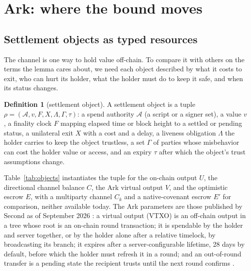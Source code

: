 \documentclass[11pt]{article}
\theoremstyle{plain}
\theoremstyle{definition}
\newtheorem{definition}{Definition}
\theoremstyle{remark}
\newcommand{\auth}{\mathcal{A}}
\begin{document}
\section{Ark: where the bound moves}
\label{sec:ark}

\subsection{Settlement objects as typed resources}

The channel is one way to hold value off-chain. To compare it with others on the terms the lemma cares about, we need each object described by what it costs to exit, who can hurt its holder, what the holder must do to keep it safe, and when its status changes.

\begin{definition}[settlement object]
A settlement object is a tuple $\rho=(\auth,v,F,X,\Lambda,\Gamma,\tau)$: a spend authority $\auth$ (a script or a signer set), a value $v$, a finality clock $F$ mapping elapsed time or block height to a settled or pending status, a unilateral exit $X$ with a cost and a delay, a liveness obligation $\Lambda$ the holder carries to keep the object trustless, a set $\Gamma$ of parties whose misbehavior can cost the holder value or access, and an expiry $\tau$ after which the object's trust assumptions change.
\end{definition}

Table~\ref{tab:objects} instantiates the tuple for the on-chain output $U$, the directional channel balance $C$, the Ark virtual output $V$, and the optimistic escrow $E$, with a multiparty channel $C_k$ and a native-covenant escrow $E'$ for comparison, neither available today. The Ark parameters are those published by Second as of September 2026 \citep{second2026vtxo,second2026forfeits}: a virtual output (VTXO) is an off-chain output in a tree whose root is an on-chain round transaction; it is spendable by the holder and server together, or by the holder alone after a relative timelock, by broadcasting its branch; it expires after a server-configurable lifetime, 28 days by default, before which the holder must refresh it in a round; and an out-of-round transfer is a pending state the recipient trusts until the next round confirms \citep{optech-ark}.
\end{document}
